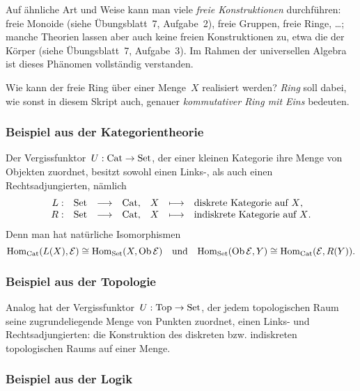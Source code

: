 Auf ähnliche Art und Weise kann man viele \emph{freie Konstruktionen}
durchführen: freie Monoide (siehe Übungsblatt~7, Aufgabe~2), freie Gruppen,
freie Ringe, \ldots; manche Theorien lassen aber auch keine freien
Konstruktionen zu, etwa die der Körper (siehe Übungsblatt~7, Aufgabe~3). Im
Rahmen der universellen Algebra ist dieses Phänomen vollständig verstanden.

\begin{aufg}Wie kann der freie Ring über einer Menge~$X$ realisiert werden?
\emph{Ring} soll dabei, wie sonst in diesem Skript auch, genauer
\emph{kommutativer Ring mit Eins} bedeuten.\end{aufg}


\subsubsection*{Beispiel aus der Kategorientheorie}

Der Vergissfunktor~$U : \mathrm{Cat} \to \mathrm{Set}$, der einer kleinen Kategorie
ihre Menge von Objekten zuordnet, besitzt sowohl einen Links-, als auch einen
Rechtsadjungierten, nämlich
\[ \begin{array}{@{}rrclrcl@{}}
  L : & \Set &\longrightarrow& \Cat, & X &\longmapsto& \text{diskrete Kategorie auf~$X$,} \\
  R : & \Set &\longrightarrow& \Cat, & X &\longmapsto& \text{indiskrete Kategorie auf~$X$.}
\end{array} \]
Denn man hat natürliche Isomorphismen
\[ \mathrm{Hom}_{\mathrm{Cat}}(L(X), \mathcal{E}) \cong \mathrm{Hom}_{\mathrm{Set}}(X, \operatorname{Ob}\mathcal{E})
  \quad\text{und}\quad
  \mathrm{Hom}_{\mathrm{Set}}(\operatorname{Ob}\mathcal{E}, Y) \cong \mathrm{Hom}_{\mathrm{Cat}}(\mathcal{E}, R(Y)). \]



\subsubsection*{Beispiel aus der Topologie}

Analog hat der Vergissfunktor~$U : \mathrm{Top} \to \mathrm{Set}$, der jedem
topologischen Raum seine zugrundeliegende Menge von Punkten zuordnet, einen
Links- und Rechtsadjungierten: die Konstruktion des diskreten bzw. indiskreten
topologischen Raums auf einer Menge.


\subsubsection*{Beispiel aus der Logik}

